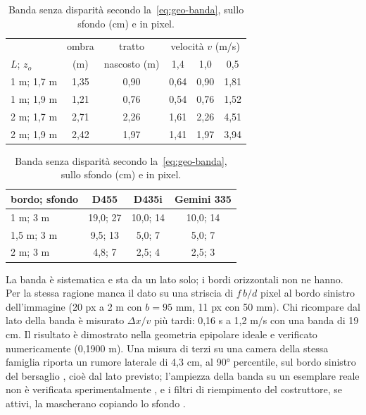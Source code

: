 \begin{table}[htb]\small
\begin{minipage}[t]{0.52\textwidth}\centering
\caption{Durata dell'occlusione totale $T_{\mathrm{tot}}$ (s) secondo la~\eqref{eq:geo-durata}, con $z_p=2{,}3$ m e $w=0{,}45$ m. }\label{tab:geo-durata}
\begin{tabular}{@{}lccccc@{}}
\toprule
 & ombra & tratto & \multicolumn{3}{c}{velocità $v$ (m/s)}\\
$L$; $z_o$ & (m) & nascosto (m) & 1,4 & 1,0 & 0,5\\
\midrule
1 m; 1,7 m & 1,35 & 0,90 & 0,64 & 0,90 & 1,81\\
1 m; 1,9 m & 1,21 & 0,76 & 0,54 & 0,76 & 1,52\\
2 m; 1,7 m & 2,71 & 2,26 & 1,61 & 2,26 & 4,51\\
2 m; 1,9 m & 2,42 & 1,97 & 1,41 & 1,97 & 3,94\\
\bottomrule
\end{tabular}
\end{minipage}\hfill
\begin{minipage}[t]{0.45\textwidth}\centering
\caption{Banda senza disparità secondo la~\eqref{eq:geo-banda}, sullo sfondo (cm) e in pixel. }\label{tab:geo-banda}
\begin{tabular}{@{}lccc@{}}
\toprule
bordo; sfondo & D455 & D435i & Gemini 335\\
\midrule
1 m; 3 m & 19,0; 27 & 10,0; 14 & 10,0; 14\\
1,5 m; 3 m & 9,5; 13 & 5,0; 7 & 5,0; 7\\
2 m; 3 m & 4,8; 7 & 2,5; 4 & 2,5; 3\\
\bottomrule
\end{tabular}
\end{minipage}
\end{table}

La banda è sistematica e sta da un lato solo; i bordi orizzontali non ne hanno. Per la stessa ragione manca il dato su una striscia di $f\,b/d$ pixel al bordo sinistro dell'immagine (20 px a 2 m con $b=95$ mm, 11 px con 50 mm). Chi ricompare dal lato della banda è misurato $\Delta x/v$ più tardi: 0,16 s a 1,2 m/s con una banda di 19 cm. Il risultato è dimostrato nella geometria epipolare ideale e verificato numericamente (0,1900 m). Una misura di terzi su una camera della stessa famiglia riporta un rumore laterale di 4,3 cm, al 90° percentile, sul bordo sinistro del bersaglio \cite{ahn2019}, cioè dal lato previsto; l'ampiezza della banda su un esemplare reale non è verificata sperimentalmente , e i filtri di riempimento del costruttore, se attivi, la mascherano copiando lo sfondo \cite{realsense-filtri-post}.

